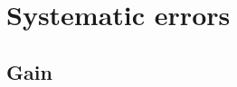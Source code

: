 \section{Systematic errors}
\label{sec:Systematic Errors}



\subsection{Gain}
\label{sub:gain}



\cleardoublepage
